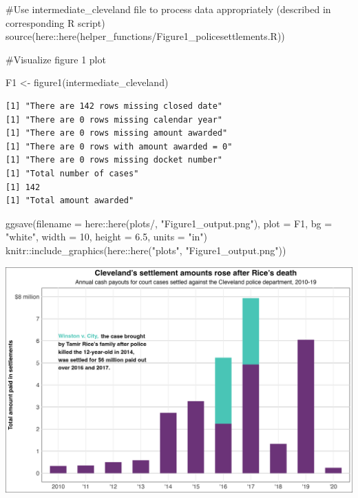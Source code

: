 \documentclass[
  letterpaper,
  DIV=11,
  numbers=noendperiod]{scrartcl}
\newenvironment{Shaded}{\begin{snugshade}}{\end{snugshade}}
\newcommand{\AttributeTok}[1]{\textcolor[rgb]{0.40,0.45,0.13}{#1}}
\newcommand{\CommentTok}[1]{\textcolor[rgb]{0.37,0.37,0.37}{#1}}
\newcommand{\DecValTok}[1]{\textcolor[rgb]{0.68,0.00,0.00}{#1}}
\newcommand{\FloatTok}[1]{\textcolor[rgb]{0.68,0.00,0.00}{#1}}
\newcommand{\FunctionTok}[1]{\textcolor[rgb]{0.28,0.35,0.67}{#1}}
\newcommand{\NormalTok}[1]{\textcolor[rgb]{0.00,0.23,0.31}{#1}}
\newcommand{\OtherTok}[1]{\textcolor[rgb]{0.00,0.23,0.31}{#1}}
\newcommand{\SpecialCharTok}[1]{\textcolor[rgb]{0.37,0.37,0.37}{#1}}
\newcommand{\StringTok}[1]{\textcolor[rgb]{0.13,0.47,0.30}{#1}}
\begin{document}
\begin{Shaded}
\begin{Highlighting}[]
\CommentTok{\#Use intermediate\_cleveland file to process data appropriately (described in corresponding R script)}
\FunctionTok{source}\NormalTok{(here}\SpecialCharTok{::}\FunctionTok{here}\NormalTok{(}\StringTok{\textquotesingle{}helper\_functions/Figure1\_policesettlements.R\textquotesingle{}}\NormalTok{))}

\CommentTok{\#Visualize figure 1 plot }

\NormalTok{F1 }\OtherTok{\textless{}{-}} \FunctionTok{figure1}\NormalTok{(intermediate\_cleveland)}
\end{Highlighting}
\end{Shaded}

\begin{verbatim}
[1] "There are 142 rows missing closed date"
[1] "There are 0 rows missing calendar year"
[1] "There are 0 rows missing amount awarded"
[1] "There are 0 rows with amount awarded = 0"
[1] "There are 0 rows missing docket number"
[1] "Total number of cases"
[1] 142
[1] "Total amount awarded"
\end{verbatim}

\begin{Shaded}
\begin{Highlighting}[]
\FunctionTok{ggsave}\NormalTok{(}\AttributeTok{filename =}\NormalTok{ here}\SpecialCharTok{::}\FunctionTok{here}\NormalTok{(}\StringTok{\textquotesingle{}plots/\textquotesingle{}}\NormalTok{, }\StringTok{"Figure1\_output.png"}\NormalTok{), }
       \AttributeTok{plot =}\NormalTok{ F1, }
       \AttributeTok{bg =} \StringTok{"white"}\NormalTok{, }\AttributeTok{width =} \DecValTok{10}\NormalTok{, }\AttributeTok{height =} \FloatTok{6.5}\NormalTok{, }\AttributeTok{units =} \StringTok{"in"}\NormalTok{)}
\NormalTok{knitr}\SpecialCharTok{::}\FunctionTok{include\_graphics}\NormalTok{(here}\SpecialCharTok{::}\FunctionTok{here}\NormalTok{(}\StringTok{"plots"}\NormalTok{, }\StringTok{"Figure1\_output.png"}\NormalTok{))}
\end{Highlighting}
\end{Shaded}

\includegraphics{plots/Figure1_output.png}
\end{document}

